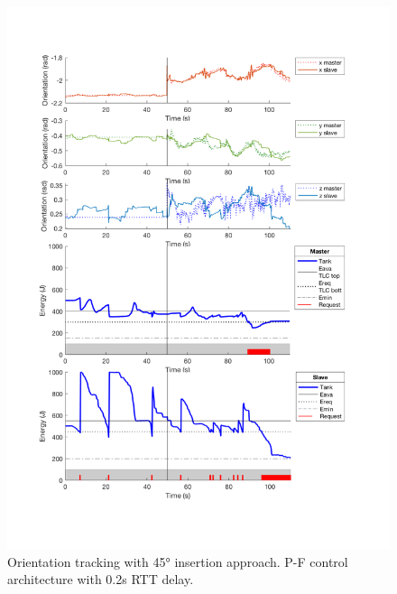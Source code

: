 \begin{center}
	\begin{figure}
		\includegraphics[width=\textwidth, keepaspectratio]{plots/pf45Delay/Orientation.pdf}
		\caption{Orientation tracking with 45° insertion approach. P-F control architecture with 0.2s RTT delay.}
		\label{graph:pf45Delay/Orientation}
	\end{figure}
\end{center}
